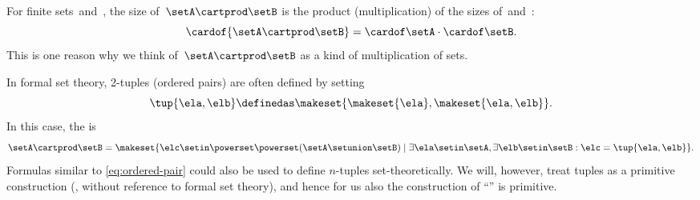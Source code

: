 %

\begin{remark}
    For finite sets~\setA and~\setB, the size of~$\setA \cartprod \setB$ is the product (multiplication) of the sizes of~\setA and~\setB:
    \begin{equation}
        \cardof{\setA \cartprod \setB} = \cardof\setA \cdot \cardof \setB.
    \end{equation}
    This is one reason why we think of~$\setA \cartprod \setB$ as a kind of multiplication of sets.
\end{remark}

\begin{remark}
    In formal set theory, 2-tuples (ordered pairs) are often defined by setting
    \begin{equation}
        \label{eq:ordered-pair}
        \tup{\ela, \elb} \definedas \makeset{ \makeset{\ela }, \makeset{ \ela, \elb } }.
    \end{equation}
    In this case, the  is
    \begin{equation}
        \setA \cartprod \setB = \makeset{ \elc \setin\powerset \powerset (\setA \setunion \setB) \mid \exists \ela \setin\setA, \exists \elb \setin\setB : \elc = \tup{\ela, \elb} }.
    \end{equation}
    Formulas similar to \cref{eq:ordered-pair} could also be used to define $n$-tuples set-theoretically.
    We will, however, treat tuples as a primitive construction (\ie, without reference to formal set theory), and hence for us also the construction of ``'' is primitive.
\end{remark}

